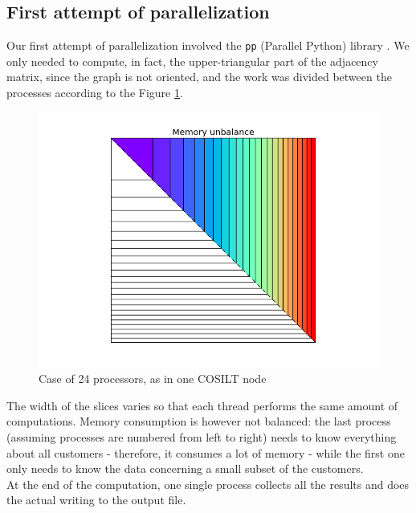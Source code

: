 \documentclass[a4paper,11pt]{book}
\begin{document}
\subsection{First attempt of parallelization}
Our first attempt of parallelization involved the \lstinline!pp! (Parallel Python) library\cite{pp} . We only needed to compute, in fact, the upper-triangular part of the adjacency matrix, since the graph is not oriented, and the work was divided between the processes according to the Figure \ref{fig:old}.
\begin{figure}[H]
\centering
\includegraphics[height=8.415 cm,width=11.25 cm]{old.png}
\caption{Case of 24 processors, as in one COSILT node}\label{fig:old}
\end{figure}
The width of the slices varies so that each thread performs the same amount of computations. Memory consumption is however not balanced: the last process (assuming processes are numbered from left to right) needs to know everything about all customers - therefore, it consumes a lot of memory - while the first one only needs to know the data concerning a small subset of the customers.\\
At the end of the computation, one single process collects all the results and does the actual writing to the output file.\\
\end{document}
